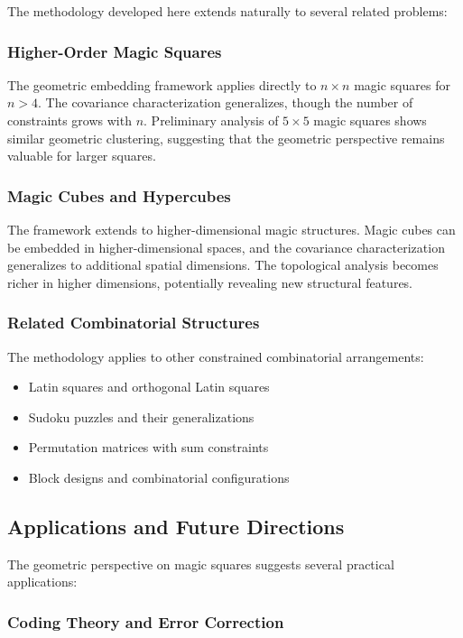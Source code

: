 The methodology developed here extends naturally to several related problems:

\subsubsection{Higher-Order Magic Squares}

The geometric embedding framework applies directly to $n \times n$ magic squares for $n > 4$. The covariance characterization generalizes, though the number of constraints grows with $n$. Preliminary analysis of $5 \times 5$ magic squares shows similar geometric clustering, suggesting that the geometric perspective remains valuable for larger squares.

\subsubsection{Magic Cubes and Hypercubes}

The framework extends to higher-dimensional magic structures. Magic cubes can be embedded in higher-dimensional spaces, and the covariance characterization generalizes to additional spatial dimensions. The topological analysis becomes richer in higher dimensions, potentially revealing new structural features.

\subsubsection{Related Combinatorial Structures}

The methodology applies to other constrained combinatorial arrangements:
\begin{itemize}
    \item Latin squares and orthogonal Latin squares
    \item Sudoku puzzles and their generalizations
    \item Permutation matrices with sum constraints
    \item Block designs and combinatorial configurations
\end{itemize}

\subsection{Applications and Future Directions}

The geometric perspective on magic squares suggests several practical applications:

\subsubsection{Coding Theory and Error Correction}

